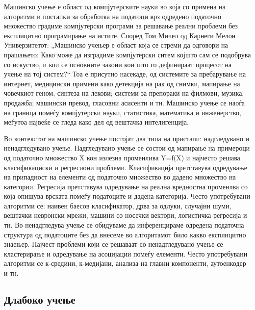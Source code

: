Машинско учење е област од компјутерските науки во која со примена на алгоритми и постапки за обработка на податоци врз одредено податочно множество градиме компјутерски програми за решавање реални проблеми без експлицитно програмирање на истите. Според Том Мичел од Карнеги Мелон Универзитетот: „Машинско учењер е област која се стреми да одговори на прашањето: Како може да изградиме компјутерски ситем којшто сам се подобрува со искуство, и кои се основните закони кои што го дефинираат процесот на учење на тој систем?“ Тоа е присутно насекаде, од системите за пребарување на интернет, медицински примени како детекција на рак од снимки, мапирање на човечкиот геном, синтеза на лекови; системи за препораки на филмови, музика, продажба; машински превод, гласовни асисенти и тн. Машинско учење се наоѓа на граница помеѓу компјутерски науки, статистика, математика и инженерство, меѓутоа највеќе се гледа како дел од вештачка интелигенција.

Во контекстот на машинско учење постојат два типа на пристапи: надгледувано и ненадгледувано учење. Надгледувано учење се состои од мапирање на примероци од податочно множество X кон излезна променлива Y=f(X) и најчесто решава класификациски и регресиони проблеми. Класификација претставува одредување на припадност на елементи од податочно множество во дадено множество на категории. Регресија претставува одредување на реална вредностна променлва со која опишува врската помеѓу податоците и дадена категорија. Често употребувани алгоритми се: наивен баесов класификатор, дрва за одлуки, случајни шуми, вештачки невронски мрежи, машини со носечки вектори, логистичка регресија и тн. 
Во ненадгледува учење се обидуваме да инференцираме одредена податочна структура од податоците без да внесеме во алгоритамот било какво експлицитно знаењер. Најчест проблеми који се решаваат со ненадгледувано учење се кластерирање и одредување на асоцијации помеѓу елементи. Често употребувани алгоритми се к-средини, к-медијани, анализа на главни компоненти, аутоенкодер и тн.

\subsection{Длабоко учење}

